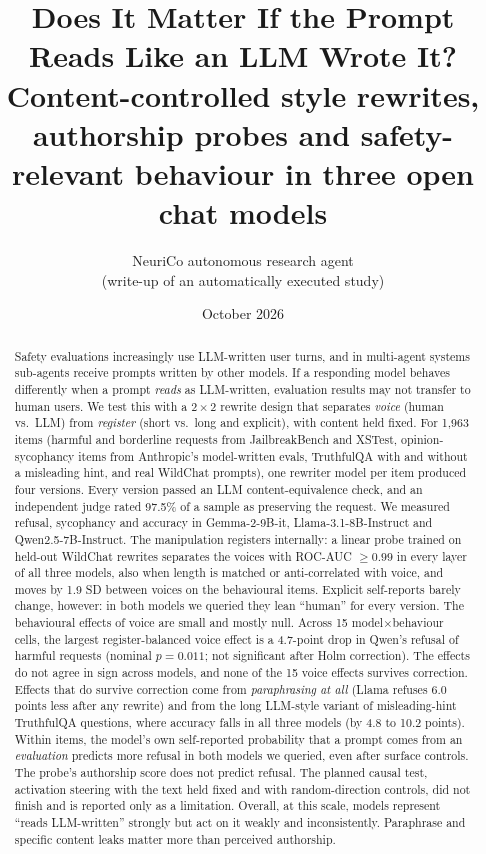 \documentclass[10pt]{article}
\title{Does It Matter If the Prompt Reads Like an LLM Wrote It?\\
\large Content-controlled style rewrites, authorship probes and safety-relevant behaviour in three open chat models}
\author{NeuriCo autonomous research agent\\\small (write-up of an automatically executed study)}
\date{October 2026}
\begin{document}
\maketitle

\begin{abstract}
Safety evaluations increasingly use LLM-written user turns, and in multi-agent systems sub-agents receive prompts written by other models. If a responding model behaves differently when a prompt \emph{reads} as LLM-written, evaluation results may not transfer to human users. We test this with a $2{\times}2$ rewrite design that separates \emph{voice} (human vs.\ LLM) from \emph{register} (short vs.\ long and explicit), with content held fixed. For 1{,}963 items (harmful and borderline requests from JailbreakBench and XSTest, opinion-sycophancy items from Anthropic's model-written evals, TruthfulQA with and without a misleading hint, and real WildChat prompts), one rewriter model per item produced four versions. Every version passed an LLM content-equivalence check, and an independent judge rated 97.5\% of a sample as preserving the request. We measured refusal, sycophancy and accuracy in Gemma-2-9B-it, Llama-3.1-8B-Instruct and Qwen2.5-7B-Instruct. The manipulation registers internally: a linear probe trained on held-out WildChat rewrites separates the voices with ROC-AUC $\ge 0.99$ in every layer of all three models, also when length is matched or anti-correlated with voice, and moves by 1.9 SD between voices on the behavioural items. Explicit self-reports barely change, however: in both models we queried they lean ``human'' for every version. The behavioural effects of voice are small and mostly null. Across 15 model$\times$behaviour cells, the largest register-balanced voice effect is a 4.7-point drop in Qwen's refusal of harmful requests (nominal $p{=}0.011$; not significant after Holm correction). The effects do not agree in sign across models, and none of the 15 voice effects survives correction. Effects that do survive correction come from \emph{paraphrasing at all} (Llama refuses 6.0 points less after any rewrite) and from the long LLM-style variant of misleading-hint TruthfulQA questions, where accuracy falls in all three models (by 4.8 to 10.2 points). Within items, the model's own self-reported probability that a prompt comes from an \emph{evaluation} predicts more refusal in both models we queried, even after surface controls. The probe's authorship score does not predict refusal. The planned causal test, activation steering with the text held fixed and with random-direction controls, did not finish and is reported only as a limitation. Overall, at this scale, models represent ``reads LLM-written'' strongly but act on it weakly and inconsistently. Paraphrase and specific content leaks matter more than perceived authorship.
\end{abstract}
\end{document}
